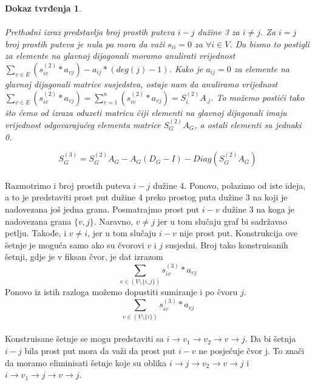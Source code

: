 \documentclass[11pt]{article}
\newtheorem*{custom_proof}{Dokaz tvrđenja}
\begin{document}
\begin{custom_proof}
			\paragraph{}
			Prethodni izraz predstavlja broj prostih puteva $i-j$ dužine 3 za $i \neq j$. 
			Za $i = j$ broj prostih puteva je nula pa mora da važi $s_{ii} = 0$ za $\forall i \in V$. 
			Da bismo to postigli za elemente na glavnoj dijagonali moramo anulirati vrijednost $\sum_{v \in E} (s_{iv}^{(2)} * a_{vj}) - a_{ij} * (deg(j)  - 1)$.
			Kako je $a_{ij} = 0$ za elemente na glavnoj dijagonali matrice susjedstva, ostaje nam da anuliramo vrijednost $\sum_{v \in E} (s_{iv}^{(2)}*a_{vj}) = \sum_{v = 1}^{n} (s_{iv}^{(2)}*a_{vj}) = S_{i.}^{(2)} A_{.j}$.
			To možemo postići tako što ćemo od izraza oduzeti matricu čiji elementi na glavnoj dijagonali imaju vrijednost odgovarajućeg elementa matrice $S_G^{(2)} A_G$, a ostali elementi su jednaki 0.
			
			\[
				S_G^{(3)} = S_G^{(2)} A_G - A_G (D_G - I) - Diag(S_G^{(2)} A_G)
			\]
			\end{custom_proof}
	
			\paragraph{}
			Razmotrimo i broj prostih puteva $i-j$ dužine 4. Ponovo, polazimo od iste ideja, a to je predstaviti prost put dužine 4 preko prostog puta dužine 3 na koji je nadovezana još jedna grana.
			Posmatrajmo prost put $i-v$ dužine 3 na koga je nadovezana grana $\{v,j\}$. Naravno, $v \neq j$ jer u tom slučaju graf bi sadržavao petlju. Takođe, i $v \neq i$, jer u tom slučaju $i-v$ nije prost put.
			Konstrukcija ove šetnje je moguća samo ako su čvorovi $v$ i $j$ susjedni. Broj tako konstruisanih šetnji, gdje je v fiksan čvor, je dat izrazom
			\[
				\sum_{v \in  (V \setminus \{i,j\})} s_{iv}^{(3)} * a_{vj}
			\]
			Ponovo iz istih razloga možemo dopustiti sumiranje i po čvoru $j$.
			\[
				\sum_{v \in (V \setminus \{i\})} s_{iv}^{(3)} * a_{vj}
			\]

			\paragraph{}
			Konstruisane šetnje se mogu predstaviti sa $i \rightarrow v_1 \rightarrow v_2 \rightarrow v \rightarrow j$. 
			Da bi šetnja $i-j$ bila prost put mora da važi da prost put $i-v$ ne posjećuje čvor j.
			To znači da moramo eliminisati šetnje koje su oblika $i \rightarrow j \rightarrow v_2 \rightarrow v \rightarrow j$ i $i \rightarrow v_1 \rightarrow j \rightarrow v \rightarrow j$. 
	
\end{document}

